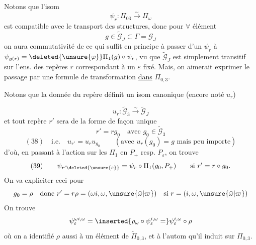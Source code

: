 Notons que l'isom
\[
\psi_r:\Pi_{03}\xrightarrow{\sim}\Pi_\omega
\]
est compatible avec le transport des structures,  donc pour $\forall$ élément
\[
g\in\widetilde{\mathcal G}_J\subset\Gamma=\mathcal G_J
\]
\inserted{
\[
\begin{aligned}
\widetilde{\mathcal G}_J=\Gamma_{P_\varepsilon}&=\left\{(g,\tau^{\unsure{\operatorname{sg}g|\alpha}})\in\mathcal G_J\times\deleted{\{1,\tau\}}\inserted{\mathbb Z/2\mathbb Z}\ \middle|\ \begin{array}{l}\alpha=0\text{ si }\operatorname{sg}g=1\\\alpha=1\text{ si }\operatorname{sg}g=-1\end{array}\right\}\\
&=\{g\in\Gamma\mid \unsure{g_\varepsilon^{(\varepsilon)}|g(\varepsilon)}=\operatorname{id}_{\unsure{\varepsilon}}\}
\end{aligned}
\]
}
on aura commutativité de
ce qui suffit en principe à passer d'un $\psi_r$ à $\psi_{g(r)}=\deleted{\unsure{\varphi}}\Pi_1(g)\circ\psi_r$, vu que  $\widetilde{\mathcal G}_J$ est simplement transitif sur l'ens. des repères $r$ correspondant à un $\varepsilon$ fixé. Mais, on aimerait exprimer le passage par une formule de transformation \uline{dans} $\Pi_{0,3}$.

Notons que la donnée du repère  définit un isom canonique (encore noté $u_r$)

\[
u_r:\widetilde{\mathcal G}_3\xrightarrow{\sim}\widetilde{\mathcal G}_J
\]
et tout repère $r'$  sera de la forme de façon unique
\[
r'=rg_0\quad\text{avec }g_0\in\widetilde{\mathcal G}_3
\]
\[
(38)\quad\text{i.e.}\quad u_{r'}=u_ru_{g_0}\qquad(\text{avec }u_r(g_0)=g\text{ mais peu importe})
\]
d'où, en passant à l'action sur les $\Pi_1$ en $P_+$ resp. $P_\varepsilon$, on trouve
\[
(39)\qquad \psi_{r'\deleted{\unsure{\varepsilon}}}=\psi_r\circ\Pi_1(g_0,P_+)\qquad\text{si }r'=r\circ g_0.
\]
On va expliciter ceci pour
\[
g_0=\rho\quad\text{donc }r'=r\rho=(\omega i,\omega,\unsure{\bar\omega|\varpi})\quad\text{si }r=(i,\omega,\unsure{\bar\omega|\varpi})
\]
On trouve
\[
\psi_\varepsilon^{\omega i,\omega}=\inserted{\rho_\omega\circ\psi_\varepsilon^{i,\omega}=}\psi_\varepsilon^{i,\omega}\circ\rho
\]
où on a identifié $\rho$ aussi à un élément de $\widetilde\Pi_{0,3}$, et à l'autom qu'il induit sur $\Pi_{0,3}$.

